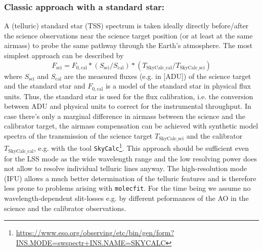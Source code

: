 \subsubsection{Classic approach with a standard star:}\label{sssec:tecllcorrclassic}
A (telluric) standard star (\ac{TSS}) spectrum is taken ideally directly before/after the science observations near the science target position (or at least at the same airmass) to probe the same pathway through the Earth's atmosphere. The most simplest approach can be described by
\begin{equation}
    F_\textrm{sci}=F_{0,\textrm{cal}}*\left(S_\textrm{sci}/S_\textrm{cal}\right)*\left(T_\textrm{SkyCalc\_cal} / T_\textrm{SkyCalc\_sci}\right)
\end{equation}
where $S_\textrm{sci}$ and $S_\textrm{cal}$ are the measured fluxes (e.g. in [\ac{ADU}]) of the science target and the standard star and $F_{0,\textrm{cal}}$ is a model of the standard star in physical flux units. Thus, the standard star is used for the flux calibration, i.e. the conversion between \ac{ADU} and physical units to correct for the instrumental throughput. In case there's only a marginal difference in airmass between the science and the calibrator target, the airmass compensation can be achieved with synthetic model spectra of the transmission of the science target $T_\textrm{SkyCalc\_sci}$ and the calibrator $T_\textrm{SkyCalc\_cal}$, e.g. with the tool \texttt{SkyCalc}\footnote{\url{https://www.eso.org/observing/etc/bin/gen/form?INS.MODE=swspectr+INS.NAME=SKYCALC}}. This approach should be sufficient even for the \ac{LSS} mode as the wide wavelength range and the low resolving power does not allow to resolve individual telluric lines anyway. The high-resolution mode (\ac{IFU}) allows a much better determination of the telluric features and is therefore less prone to problems arising with \texttt{molecfit}. For the time being we assume no wavelength-dependent slit-losses e.g. by different peformances of the \ac{AO} in the science and the calibrator observations.  \\

